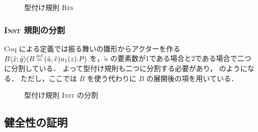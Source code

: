 \begin{figure}[t]
  \caption{型付け規則 \textsc{Res}}
  \label{api:res_rule}
\end{figure}

\subsubsection{\textsc{Inst} 規則の分割}

Coq による定義では振る舞いの雛形からアクターを作る\conf $\behaviorconf{\tilde{x}}{\tilde{y}} (B \defeq \behaviortemplate{\tilde{u}}{\tilde{v}}{u_1}{z}{P})$ を，$\tilde{u}$ の要素数が1である場合と2である場合で二つに分割している．
よって型付け規則も二つに分割する必要があり， のようになる．
ただし，ここでは $B$ を使う代わりに $B$ の展開後の項を用いている．

\begin{figure}[t]
  \vspace{14pt}
  \caption{型付け規則 \textsc{Inst} の分割}
  \label{api:inst_rule}
\end{figure}





\subsection{健全性の証明}


